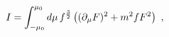 \begin{equation}
I= \int^{\mu_0}_{-\mu_0} d\mu \, f^{{3\over 2}} 
\left((\partial_\mu F)^2  + {m^2 f} F^2 \right)
\ ,
\label{angint}
\end{equation}

